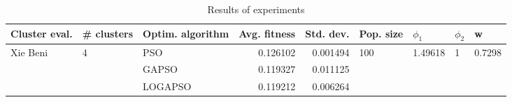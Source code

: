 \begin{table}
\centering
\caption{Results of experiments}
\begin{tabular}{lllrrllll}
\toprule
            Cluster eval. &        \# clusters & Optim. algorithm &  Avg. fitness &  Std. dev. &            Pop. size &               $\phi_{1}$ &         $\phi_{2}$ &                       w \\
\midrule
\multirow{3}{*}{Xie Beni} & \multirow{3}{*}{4} &              PSO &      0.126102 &   0.001494 & \multirow{3}{*}{100} & \multirow{3}{*}{1.49618} & \multirow{3}{*}{1} & \multirow{3}{*}{0.7298} \\
                          &                    &            GAPSO &      0.119327 &   0.011125 &                      &                          &                    &                         \\
                          &                    &          LOGAPSO &      0.119212 &   0.006264 &                      &                          &                    &                         \\
\bottomrule
\end{tabular}
\end{table}
